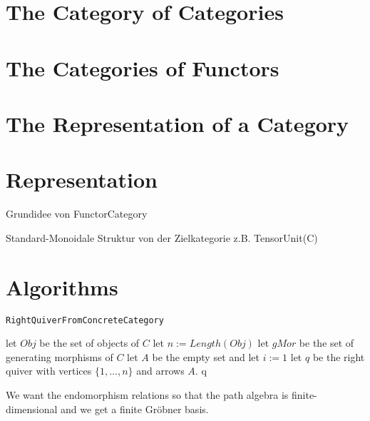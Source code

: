 \documentclass{article}
\theoremstyle{definition}
\begin{document}
\section{The Category of Categories}

\section{The Categories of Functors}

\section{The Representation of a Category}

\section{Representation}

Grundidee von FunctorCategory

Standard-Monoidale Struktur von der Zielkategorie z.B. TensorUnit(C)

\section{Algorithms}


\begin{algorithm}\capstart
    \caption{\texttt{RightQuiverFromConcreteCategory}}\label{algo:RightQuiverFromConcreteCategory}
	\BlankLine
	let $Obj$ be the set of objects of $C$\;
	let $n := Length(Obj)$\;
	let $gMor$ be the set of generating morphisms of $C$\;
	let $A$ be the empty set and let $i := 1$\;
	\BlankLine
	let $q$ be the right quiver with vertices $\{1,\dots,n\}$ and arrows $A$.
	\BlankLine
	\Return q\;
\end{algorithm}

We want the endomorphism relations so that the path algebra is finite-dimensional and we
get a finite Gröbner basis.
\end{document}
